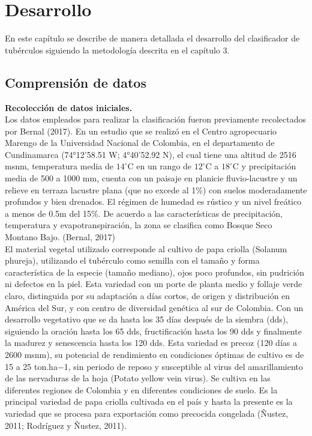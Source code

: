 \chapter{Desarrollo}

En este capítulo se describe de manera detallada el desarrollo del clasificador de tubérculos siguiendo la metodología descrita en el capítulo 3.
\noindent
\section{Comprensión de datos}

\noindent
\textbf{Recolección de datos iniciales.}\\

Los datos empleados para realizar la clasificación fueron previamente recolectados por Bernal (2017). En un estudio que se realizó en el Centro agropecuario Marengo de la Universidad Nacional de Colombia, en el departamento de Cundinamarca (74°12'58.51 W; 4°40'52.92 N), el cual tiene una altitud de 2516 msnm, temperatura media de $14^\circ$C  en un rango de $12^\circ$C  a $18^\circ$C  y precipitación media de 500 a 1000 mm, cuenta con un paisaje en planicie fluvio-lacustre y un relieve en terraza lacustre plana (que no excede al 1\%) con suelos moderadamente profundos y bien drenados. El régimen de humedad es rústico y un nivel freático a menos de 0.5m del 15\%. De acuerdo a las características de precipitación, temperatura y evapotranspiración, la zona se clasifica como Bosque Seco Montano Bajo. (Bernal, 2017)\\

El material vegetal utilizado corresponde al cultivo de papa criolla (Solanum phureja), utilizando el tubérculo como semilla con el tamaño y forma característica de la especie (tamaño mediano), ojos poco profundos, sin pudrición ni defectos en la piel. Esta variedad con un porte de planta medio y follaje verde claro, distinguida por su adaptación a días cortos, de origen y distribución en América del Sur, y con centro de diversidad genética al sur de Colombia. Con un desarrollo vegetativo que se da hasta los 35 días después de la siembra (dds), siguiendo la oración hasta los 65 dds, fructificación hasta los 90 dds y finalmente la madurez y senescencia hasta los 120 dds. Esta variedad es precoz (120 días a 2600 msnm), su potencial de rendimiento en condiciones óptimas de cultivo es de 15 a 25 ton.ha−1, sin periodo de reposo y susceptible al virus del amarillamiento de las nervaduras de la hoja (Potato yellow vein virus). Se cultiva en las diferentes regiones de Colombia y en diferentes condiciones de suelo. Es la principal variedad de papa criolla cultivada en el país y hasta la presente es la variedad que se procesa para exportación como precocida congelada (Ñustez, 2011; Rodríguez y Ñustez, 2011).\\

